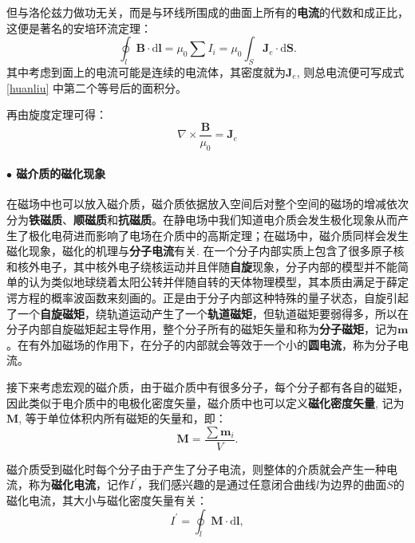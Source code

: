 \documentclass[10pt,reqno, final]{ctexart}
\begin{document}
但与洛伦兹力做功无关，而是与环线所围成的曲面上所有的\textbf{电流}的代数和成正比，这便是著名的安培环流定理：
\begin{equation}\label{huanliu}
\displaystyle  \oint_l \bm{B}\cdot \mathrm{d}\bm{l} =  \mu_0\sum{I_i} = \mu_0\int_S \bm{J}_e \cdot \mathrm{d}\bm{S}.
\end{equation}
其中考虑到面上的电流可能是连续的电流体，其密度就为$\bm{J}_e$, 则总电流便可写成式\eqref{huanliu} 中第二个等号后的面积分。

再由旋度定理可得：
\begin{equation}\label{cichanghuanliudingli}
{\nabla\times\frac{\bm{B}}{\mu_0} = \bm{J}_e}
\end{equation}

\paragraph{$\bullet$ 磁介质的磁化现象} 在磁场中也可以放入磁介质，磁介质依据放入空间后对整个空间的磁场的增减依次分为\textbf{铁磁质}、\textbf{顺磁质}和\textbf{抗磁质}。在静电场中我们知道电介质会发生极化现象从而产生了极化电荷进而影响了电场在介质中的高斯定理；在磁场中，磁介质同样会发生磁化现象，磁化的机理与\textbf{分子电流}有关. 在一个分子内部实质上包含了很多原子核和核外电子，其中核外电子绕核运动并且伴随\textbf{自旋}现象，分子内部的模型并不能简单的认为类似地球绕着太阳公转并伴随自转的天体物理模型，其本质由满足于薛定谔方程的概率波函数来刻画的。正是由于分子内部这种特殊的量子状态，自旋引起了一个\textbf{自旋磁矩}，绕轨道运动产生了一个\textbf{轨道磁矩}，但轨道磁矩要弱得多，所以在分子内部自旋磁矩起主导作用，整个分子所有的磁矩矢量和称为\textbf{分子磁矩}，记为$\bm{m}$。在有外加磁场的作用下，在分子的内部就会等效于一个小的\textbf{圆电流}，称为分子电流。

接下来考虑宏观的磁介质，由于磁介质中有很多分子，每个分子都有各自的磁矩，因此类似于电介质中的电极化密度矢量，磁介质中也可以定义\textbf{磁化密度矢量}, 记为$\bm{M}$, 等于单位体积内所有磁矩的矢量和，即：
\begin{equation}
\displaystyle \bm{M} = \frac{\sum \bm{m}_i}{V}.
\end{equation}

磁介质受到磁化时每个分子由于产生了分子电流，则整体的介质就会产生一种电流，称为\textbf{磁化电流}，记作$I^\prime$，我们感兴趣的是通过任意闭合曲线$l$为边界的曲面$S$的磁化电流，其大小与磁化密度矢量有关：
\begin{equation}\label{cihuadianliu}
I^\prime = \oint_l \bm{M}\cdot\mathrm{d}\bm{l},
\end{equation}
\end{document}
